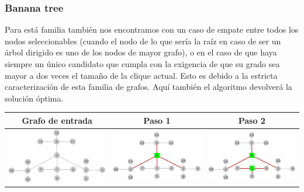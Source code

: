 \subsubsection{Banana tree}
\label{subsub:banana}
	Para est\'a familia tambi\'en nos encontramos con un caso de empate entre todos los 
	nodos seleccionables (cuando el nodo de lo que ser\'ia la ra\'iz en caso de ser
	un \'arbol dirigido es uno de los nodos de mayor grafo), o en el caso de que
	haya siempre un \'unico candidato que cumpla con la exigencia de que su grado sea
	mayor a dos veces el tama\~no de la clique actual. Esto es debido a la estricta 
	caracterizaci\'on de esta familia de grafos. Aqu\'i tambi\'en el algoritmo 
	devolver\'a la soluci\'on \'optima.
	\begin{center}
		\begin{tabular}{ |c||c|c| }
			\hline
			Grafo de entrada & Paso 1 & Paso 2 \\
			\hline\hline
			\includegraphics[scale = 0.2]{img/ej3/constructiva_golosa/banana4,4_st0.png} &
			\includegraphics[scale = 0.2]{img/ej3/constructiva_golosa/banana4,4_st1.png} & 
			\includegraphics[scale = 0.2]{img/ej3/constructiva_golosa/banana4,4_st2.png} \\

\end{tabular}
\end{center}
